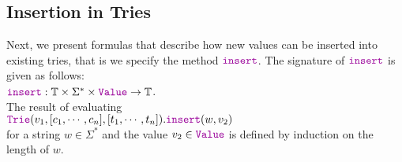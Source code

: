 \subsection{Insertion in Tries}
Next, we present formulas that describe how new values can be inserted into existing tries,
that is we specify the method $\mytt{insert}$.  The signature of $\mytt{insert}$ is given as follows:
\\[0.2cm]
\hspace*{1.3cm}
$\mytt{insert}: \mathbb{T} \times \Sigma^* \times \mytt{Value} \rightarrow \mathbb{T}$.
\\[0.2cm]
The result of evaluating \\[0.2cm]
\hspace*{1.3cm} 
$\mytt{Trie}(v_1, [c_1, \cdots, c_n], [t_1, \cdots, t_n]).\mytt{insert}(w, v_2)$
\\[0.2cm]
for a string $w\in \Sigma^*$ and the value $v_2 \in \mytt{Value}$ is defined by induction on the
length of $w$.
